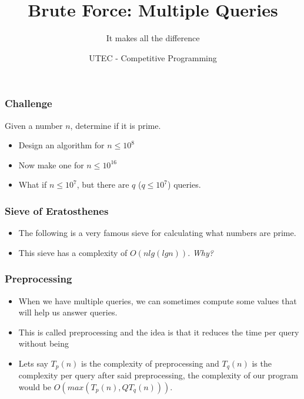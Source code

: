 \documentclass{beamer}
\begin{document}
\newcommand{\tabitem}{~~\llap{\textbullet}~~}




\title{Brute Force: Multiple Queries}
\subtitle{It makes all the difference}
\author{UTEC - Competitive Programming}
\date{}

\maketitle

\begin{frame}
	\frametitle{Challenge}

	Given a number $n$, determine if it is prime.

	\begin{itemize}
		\item<1-> Design an algorithm for  $n \leq 10^8$
		\item<2-> Now make one for $n \leq 10^{16}$
		\item<3-> What if $n \leq 10^7$, but there are $q$ ($q \leq 10^7$) queries.
	\end{itemize}
\end{frame}

\begin{frame}[fragile]
	\frametitle{Sieve of Eratosthenes}

	\begin{itemize}
		\item The following is a very famous sieve for calculating what numbers are prime.
		\item This sieve has a complexity of $O(nlg(lgn))$. \textit{Why?}
	\end{itemize}

	
\end{frame}

\begin{frame}
	\frametitle{Preprocessing}

	\begin{itemize}
		\item When we have multiple queries, we can sometimes compute some values that will help us answer queries.
		\item This is called preprocessing and the idea is that it reduces the time per query without being 
		\item Lets say $T_p(n)$ is the complexity of preprocessing and $T_q(n)$ is the complexity per query after said preprocessing, the complexity of our program would be $O(max(T_{p}(n), Q T_{q}(n)))$.
	\end{itemize}
\end{frame}
\end{document}
